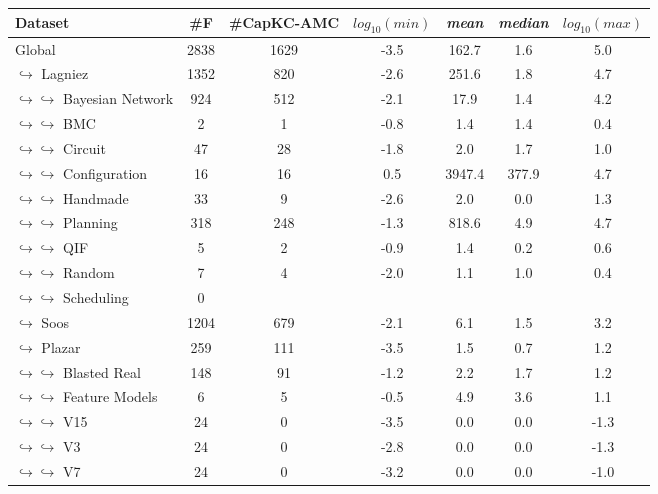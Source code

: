 \documentclass{article}
\newcommand\capkcamc[0]{CapKC-AMC\xspace}
\begin{document}
    
\begin{table}[h!]
        \centering
            \begin{tabular}{l|c|c|c|c|c|c}
                Dataset & \#F & \#\capkcamc & $\textit{log}_{10}(\textit{min})$ & \textit{mean} & \textit{median} & $\textit{log}_{10}(\textit{max})$ \\
                \hline 
Global & 2838 & 1629 &  -3.5 & 162.7 &   1.6 &   5.0 \\
$\hookrightarrow$ Lagniez \cite{D4} & 1352 & 820 &  -2.6 & 251.6 &   1.8 &   4.7 \\
$\hookrightarrow \hookrightarrow$ Bayesian Network & 924 & 512 &  -2.1 &  17.9 &   1.4 &   4.2 \\
$\hookrightarrow \hookrightarrow$ BMC & 2 & 1 &  -0.8 &   1.4 &   1.4 &   0.4 \\
$\hookrightarrow \hookrightarrow$ Circuit & 47 & 28 &  -1.8 &   2.0 &   1.7 &   1.0 \\
$\hookrightarrow \hookrightarrow$ Configuration & 16 & 16 &   0.5 & 3947.4 & 377.9 &   4.7 \\
$\hookrightarrow \hookrightarrow$ Handmade & 33 & 9 &  -2.6 &   2.0 &   0.0 &   1.3 \\
$\hookrightarrow \hookrightarrow$ Planning & 318 & 248 &  -1.3 & 818.6 &   4.9 &   4.7 \\
$\hookrightarrow \hookrightarrow$ QIF & 5 & 2 &  -0.9 &   1.4 &   0.2 &   0.6 \\
$\hookrightarrow \hookrightarrow$ Random & 7 & 4 &  -2.0 &   1.1 &   1.0 &   0.4 \\
$\hookrightarrow \hookrightarrow$ Scheduling & 0 & & & \\
$\hookrightarrow$ Soos \cite{soos_2024_10449477} & 1204 & 679 &  -2.1 &   6.1 &   1.5 &   3.2 \\
$\hookrightarrow$ Plazar \cite{Plazar2019} & 259 & 111 &  -3.5 &   1.5 &   0.7 &   1.2 \\
$\hookrightarrow \hookrightarrow$ Blasted Real & 148 & 91 &  -1.2 &   2.2 &   1.7 &   1.2 \\
$\hookrightarrow \hookrightarrow$ Feature Models & 6 & 5 &  -0.5 &   4.9 &   3.6 &   1.1 \\
$\hookrightarrow \hookrightarrow$ V15 & 24 & 0 &  -3.5 &   0.0 &   0.0 &  -1.3 \\
$\hookrightarrow \hookrightarrow$ V3 & 24 & 0 &  -2.8 &   0.0 &   0.0 &  -1.3 \\
$\hookrightarrow \hookrightarrow$ V7 & 24 & 0 &  -3.2 &   0.0 &   0.0 &  -1.0 \\

\end{tabular}
\end{table}
\end{document}
